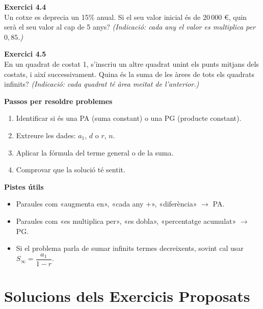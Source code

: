 \documentclass[12pt]{article}
\begin{document}
\begin{exercici}
\textbf{Exercici 4.4}\\
Un cotxe es deprecia un 15\% anual. Si el seu valor inicial és de 20\,000 €, quin serà el seu valor al cap de 5 anys?
\emph{(Indicació: cada any el valor es multiplica per $0{,}85$.)}
\end{exercici}

\begin{exercici}
\textbf{Exercici 4.5}\\
En un quadrat de costat 1, s'inscriu un altre quadrat unint els punts mitjans dels costats, i així successivament. Quina és la suma de les àrees de tots els quadrats infinits?
\emph{(Indicació: cada quadrat té àrea meitat de l'anterior.)}
\end{exercici}

\begin{resum}[title=Resum 4: Aplicacions]
\textbf{Passos per resoldre problemes}
\begin{enumerate}
    \item Identificar si és una PA (suma constant) o una PG (producte constant).
    \item Extreure les dades: $a_1$, $d$ o $r$, $n$.
    \item Aplicar la fórmula del terme general o de la suma.
    \item Comprovar que la solució té sentit.
\end{enumerate}

\textbf{Pistes útils}
\begin{itemize}
    \item Paraules com «augmenta en», «cada any +», «diferència» $\to$ PA.
    \item Paraules com «es multiplica per», «es dobla», «percentatge acumulat» $\to$ PG.
    \item Si el problema parla de sumar infinits termes decreixents, sovint cal usar $S_\infty = \dfrac{a_1}{1-r}$.
\end{itemize}
\end{resum}

\newpage

\appendix
\section{Solucions dels Exercicis Proposats}
\end{document}
